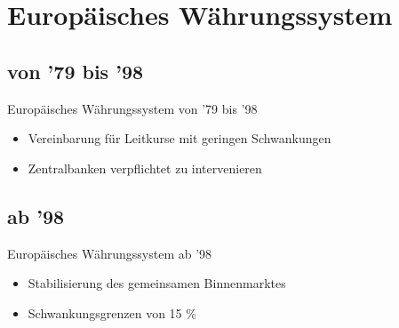 \documentclass[10pt,a4paper, ngerman]{beamer}
\begin{document}
\section{Europäisches Währungssystem}
\subsection{von '79 bis '98}
\begin{frame}{Europäisches Währungssystem von  '79 bis '98}
\begin{itemize}
\item Vereinbarung für Leitkurse mit geringen Schwankungen \pause
\item Zentralbanken verpflichtet zu intervenieren
\end{itemize}
\end{frame}

\subsection{ab '98}
\begin{frame}{Europäisches Währungssystem ab '98}
\begin{itemize}
\item Stabilisierung des gemeinsamen Binnenmarktes \pause
\item Schwankungsgrenzen von 15 \%
\end{itemize}
\end{frame}
\end{document}
